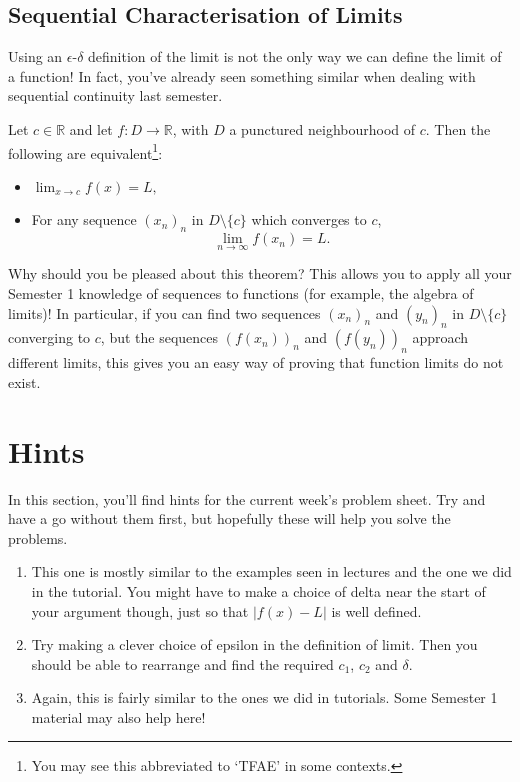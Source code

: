 \documentclass[
  12pt,
  a4paper]{extarticle}
\providecommand{\tightlist}{%
  \setlength{\itemsep}{0pt}\setlength{\parskip}{0pt}}
\theoremstyle{plain}
\theoremstyle{definition}
\theoremstyle{plain}
\theoremstyle{plain}
\theoremstyle{plain}
\theoremstyle{plain}
\theoremstyle{definition}
\theoremstyle{definition}
\theoremstyle{remark}
\theoremstyle{remark}
\let\BeginKnitrBlock\begin \let\EndKnitrBlock\end
\renewcommand{\;}{\,}
\begin{document}
\hypertarget{sequential-characterisation-of-limits}{%
\subsection{Sequential Characterisation of Limits}\label{sequential-characterisation-of-limits}}

Using an \(\epsilon\)-\(\delta\) definition of the limit is not the only way we can define the limit of a function! In fact, you've already seen something similar when dealing with sequential continuity last semester.

\BeginKnitrBlock{theorem}[Sequential Characterisation of Limit]
{\label{thm:thm1} }Let \(c\in\mathbb{R}\) and let \(f: D \to \mathbb{R}\), with \(D\) a punctured neighbourhood of \(c\). Then the following are equivalent\footnote{You may see this abbreviated to `TFAE' in some contexts.}:

\begin{itemize}
\item
  \(\lim_{x\to c}f(x) = L,\)
\item
  For any sequence \((x_n)_n\) in \(D\setminus\lbrace c \rbrace\) which converges to \(c\), \[\lim_{n\to\infty}f(x_n) =L.\]
\end{itemize}
\EndKnitrBlock{theorem}

Why should you be pleased about this theorem? This allows you to apply all your Semester 1 knowledge of sequences to functions (for example, the algebra of limits)! In particular, if you can find two sequences \((x_n)_n\) and \((y_n)_n\) in \(D\setminus\lbrace c\rbrace\) converging to \(c\), but the sequences \(\left(f(x_n)\right)_n\) and \(\left(f(y_n)\right)_n\) approach different limits, this gives you an easy way of proving that function limits do not exist.

\hypertarget{hints}{%
\section{Hints}\label{hints}}

In this section, you'll find hints for the current week's problem sheet. Try and have a go without them first, but hopefully these will help you solve the problems.

\begin{enumerate}
\def\labelenumi{\arabic{enumi})}
\tightlist
\item
  This one is mostly similar to the examples seen in lectures and the one we did in the tutorial. You might have to make a choice of delta near the start of your argument though, just so that \(\lvert f(x) - L \rvert\) is well defined.
\item
  Try making a clever choice of epsilon in the definition of limit. Then you should be able to rearrange and find the required \(c_1\), \(c_2\) and \(\delta\).
\item
  Again, this is fairly similar to the ones we did in tutorials. Some Semester 1 material may also help here!
\end{enumerate}
\end{document}
